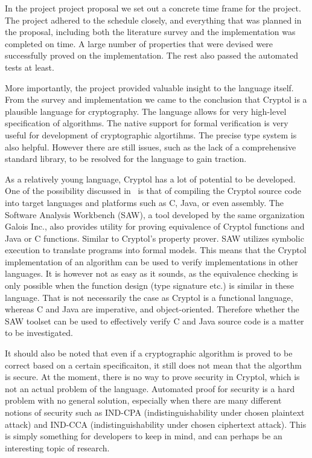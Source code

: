 \documentclass[a4paper, notitlepage]{report}
\begin{document}
In the project project proposal we set out a concrete time frame for the project.
The project adhered to the schedule closely, and everything 
that was planned in the proposal, including both the literature survey and 
the implementation was completed on time.
A large number of properties that were devised were successfully proved on
the implementation. The rest also passed the automated tests at least.

More importantly, the project provided valuable insight to the language itself.
From the survey
and implementation we came to the conclusion that Cryptol is a plausible language 
for cryptography.
The language allows for very high-level specification of algorithms.
The native support for formal verification is very useful
for development of cryptographic algortihms. The precise type system is also 
helpful. However there are still issues, such as the lack of a comprehensive standard 
library, to be resolved for the language to gain traction. 

As a relatively young language, Cryptol has a lot of potential to be developed. 
One of the possibility discussed in~\cite{lewis2003cryptol} is that of compiling 
the Cryptol source code into target languages and platforms such as C, Java, or
even assembly. The Software Analysis Workbench (SAW), a tool developed by the same
organization Galois Inc., also provides utility for proving equivalence of Cryptol 
functions and Java or C functions. 
Similar to Cryptol's property prover. SAW utilizes symbolic execution to
translate programs into formal models.
This means that the Cryptol implementation of an algorithm can be used to verify 
implementations in other languages. It is however not as easy as it sounds, 
as the equivalence checking is only possible when the function design (type signature
etc.)
is similar in these language. That is not necessarily the case as Cryptol
is a functional language, whereas C and Java are imperative, and object-oriented.
Therefore whether the SAW toolset can be used to effectively verify C and Java source
code is a matter to be investigated.

It should also be noted that even if a cryptographic algorithm is proved
to be correct based on a certain 
specificaiton, it still does
not mean that the algorthm is secure. 
At the moment, there is no way to prove security in Cryptol, 
which is not an actual problem of the language. 
Automated proof for security is a hard problem with no general solution, 
especially when there are many different notions of security such as 
IND-CPA (indistinguishability under chosen plaintext attack) and 
IND-CCA (indistinguishability under chosen ciphertext attack).
This is simply something for developers to keep in mind, and can perhaps
be an interesting topic of research.


\newpage



\end{document}
